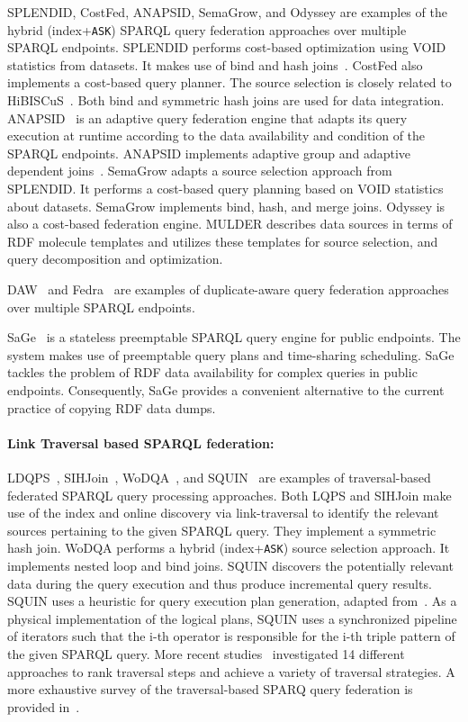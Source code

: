 \documentclass[sw]{iosart2x}
\begin{document}
SPLENDID, CostFed, ANAPSID, SemaGrow, and Odyssey are examples of the hybrid (index+\texttt{ASK}) SPARQL query federation approaches over multiple SPARQL endpoints.
SPLENDID performs cost-based optimization using VOID statistics from datasets.
It makes use of bind and hash joins~\cite{saleem2015fine}. %
CostFed also implements a cost-based query planner.
The source selection is closely related to HiBISCuS~\cite{hibiscus2014}.
Both bind and symmetric hash joins are used for data integration.
ANAPSID~\cite{anapsid2011} is an adaptive query federation engine that adapts its query execution at runtime according to the data availability and condition of the SPARQL endpoints.
ANAPSID implements adaptive group and adaptive dependent joins~\cite{saleem2015fine}.
SemaGrow adapts a source selection approach from SPLENDID.
It performs a cost-based query planning based on VOID statistics about datasets.
SemaGrow implements bind, hash, and merge joins.
Odyssey is also a cost-based federation engine.
MULDER describes data sources in terms of RDF molecule templates and utilizes these templates for source selection, and query decomposition and optimization.

DAW~\cite{daw2013} and Fedra~\cite{fedra2015} are examples of duplicate-aware query federation approaches over multiple SPARQL endpoints.

SaGe~\cite{DBLP:journals/corr/abs-1806-00227} is a stateless preemptable SPARQL query engine for public endpoints.
The system makes use of preemptable query plans and time-sharing scheduling.
SaGe tackles the problem of RDF data availability for complex queries in public endpoints.
Consequently, SaGe provides a convenient alternative to the current practice of copying RDF data dumps.

\paragraph*{\textbf{Link Traversal based SPARQL federation:}} LDQPS~\cite{ldqp2010}, SIHJoin~\cite{sihjoin2011}, WoDQA~\cite{wodqa2012}, and SQUIN~\cite{hartig2013squin} are examples of traversal-based federated SPARQL query processing approaches.
Both LQPS and SIHJoin make use of the index and online discovery via link-traversal to identify the relevant sources pertaining to the given SPARQL query.
They implement a symmetric hash join.
WoDQA performs a hybrid (index+\texttt{ASK}) source selection approach.
It implements nested loop and bind joins.
SQUIN discovers the potentially relevant data during the query execution and thus produce incremental query results.
SQUIN uses a heuristic for query execution plan generation, adapted from~\cite{zk2011}.
As a physical implementation of the logical plans, SQUIN uses a synchronized pipeline of iterators such that the i-th operator is responsible for the i-th triple pattern of the given SPARQL query.
More recent studies~\cite{hartig2016walking} investigated 14 different approaches to rank traversal steps and achieve a variety of traversal strategies.
A more exhaustive survey of the traversal-based SPARQ query federation is provided in~\cite{hartig2009executing}.
\end{document}
